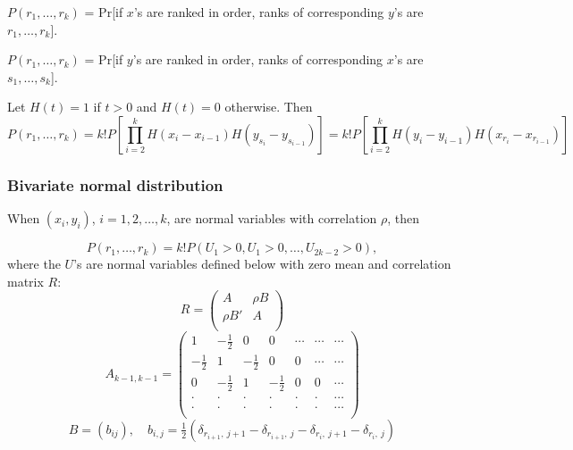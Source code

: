 $P(r_1,\ldots,r_k)$ = Pr[if $x$'s are ranked in order, ranks of corresponding $y$'s are $r_1,\ldots,r_k$]. 

$P(r_1,\ldots,r_k)$ = Pr[if $y$'s are ranked in order, ranks of corresponding $x$'s are $s_1,\ldots,s_k$]. 

Let $H(t) = 1$ if $t>0$ and $H(t)=0$ otherwise. Then
\begin{equation} 
	P(r_1,\ldots,r_k) = k! P \left[ \prod_{i=2}^k H(x_i - x_{i-1})  H(y_{s_i} - y_{s_{i-1}}) \right] = k! P \left[ \prod_{i=2}^k H(y_i - y_{i-1})  H(x_{r_i} - x_{r_{i-1}}) \right]
\end{equation}




\subsubsection{Bivariate normal distribution}
\label{KendallBivariateNormalDistribution}
When $(x_i,y_i)$, $i=1,2,\ldots,k$, are normal variables with correlation $\rho$, then 

\begin{equation} 
	P(r_1,\ldots,r_k) = k! P(U_1 > 0, U_1 > 0,\ldots, U_{2k-2} > 0), 
\end{equation} 
where the $U$'s are normal variables defined below with zero mean and correlation matrix $R$:
\begin{equation} 
	R =  \begin{pmatrix}
		A & \rho B \\
		\rho B' & A \\
	\end{pmatrix}
\end{equation} 
\begin{equation} 
	A_{k-1,k-1} =
	\begin{pmatrix}
		1             & -\tfrac{1}{2} & 0             & 0             & \cdots & \cdots & \cdots \\
		-\tfrac{1}{2} & 1             & -\tfrac{1}{2} & 0             & 0      & \cdots & \cdots \\
		0             & -\tfrac{1}{2} & 1             & -\tfrac{1}{2} & 0      & 0      & \cdots \\
		\cdot         & \cdot         & \cdot         & \cdot         & \cdot  & \cdot  & \cdots \\
		\cdot         & \cdot         & \cdot         & \cdot         & \cdot  & \cdot  & \cdots \\
	\end{pmatrix}
\end{equation} 
\begin{equation} 
	B=(b_{ij}), \quad b_{i,j} = \tfrac{1}{2} \left(\delta_{r_{i+1},\:j+1} - \delta_{r_{i+1},\:j} - \delta_{r_{i},\:j+1} - \delta_{r_{i},\:j}  \right) 
\end{equation} 

